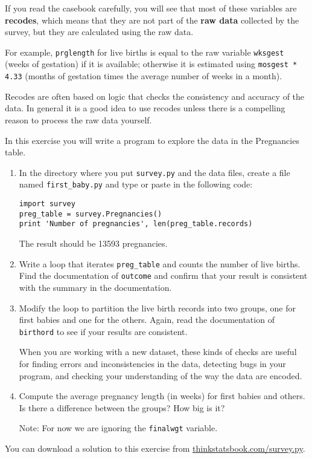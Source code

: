 \documentclass[10pt]{book}
\begin{document}
If you read the casebook carefully, you will see that most of these
variables are {\bf recodes}, which means that they are not part
of the {\bf raw data} collected by the survey, but they are
calculated using the raw data.

For example, {\tt prglength} for live births is equal to the raw
variable {\tt wksgest} (weeks of gestation) if it is available;
otherwise it is estimated using {\tt mosgest * 4.33} (months of
gestation times the average number of weeks in a month).

Recodes are often based on logic that checks the consistency and
accuracy of the data.  In general it is a good idea to use recodes
unless there is a compelling reason to process the raw data
yourself.

\begin{ex}

In this exercise you will write a program to explore the data
in the Pregnancies table.

\begin{enumerate}

\item In the directory where you put {\tt survey.py} and the
data files, create a file named \verb"first_baby.py" and
type or paste in the following code:

\begin{verbatim}
import survey
preg_table = survey.Pregnancies()
print 'Number of pregnancies', len(preg_table.records)
\end{verbatim}

The result should be 13593 pregnancies.

\item Write a loop that iterates \verb"preg_table" and counts
the number of live births.  Find the documentation of {\tt outcome}
and confirm that your result is consistent with the summary
in the documentation.

\item Modify the loop to partition the live birth records into
two groups, one for first babies and one for the others.  Again,
read the documentation of {\tt birthord} to see if your results
are consistent.

When you are working with a new dataset, these kinds of checks
are useful for finding errors and inconsistencies in the data,
detecting bugs in your program, and checking your understanding
of the way the data are encoded.

\item Compute the average pregnancy length (in weeks) for first
babies and others.  Is there a difference between the groups?  How
big is it?

Note: For now we are ignoring the {\tt finalwgt} variable.

\end{enumerate}

You can download a solution to this exercise from
\url{thinkstatsbook.com/survey.py}.

\end{ex}
\end{document}
